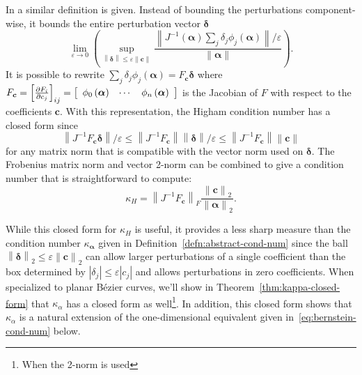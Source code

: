 \documentclass[3p, authoryear, square]{elsarticle}
\theoremstyle{definition}
\newcommand{\eps}{\varepsilon}
\begin{document}
In \cite[Chapter~25, Section 25.4]{Higham2002} a similar definition is
given. Instead of bounding the perturbations component-wise, it bounds
the entire perturbation vector \(\bm{\delta}\)
\begin{equation}
  \lim_{\eps \to 0} \left(\sup_{\left \lVert \bm{\delta} \right \rVert \leq
  \eps \left \lVert \bm{c} \right \rVert} \frac{\left \lVert
  J^{-1}\left(\bm{\alpha}\right) \sum_j \delta_j
  \phi_j\left(\bm{\alpha}\right) \right \rVert / \eps}{
  \left \lVert \bm{\alpha} \right \rVert}\right).
\end{equation}
It is possible to rewrite \(\sum_j \delta_j \phi_j\left(\bm{\alpha}\right) =
F_{\bm{c}} \bm{\delta}\) where \(F_{\bm{c}} =
\left[\frac{\partial F_i}{\partial c_j}\right]_{ij} =
\left[\begin{array}{c c c} \phi_0\left(\bm{\alpha}\right) & \cdots &
\phi_n\left(\bm{\alpha}\right) \end{array}\right]\) is the Jacobian of \(F\)
with respect to the coefficients \(\bm{c}\). With this representation, the
Higham condition number has a closed form since
\begin{equation}
  \left \lVert
  J^{-1} F_{\bm{c}} \bm{\delta} \right \rVert / \eps \leq
  \left \lVert J^{-1} F_{\bm{c}} \right \rVert \left \lVert \bm{\delta} \right
  \rVert / \eps \leq \left \lVert J^{-1} F_{\bm{c}} \right \rVert \left \lVert
  \bm{c} \right \rVert
\end{equation}
for any matrix norm that is compatible with the vector norm used on
\(\bm{\delta}\). The Frobenius matrix norm and vector 2-norm can be
combined to give a condition number that is straightforward to compute:
\begin{equation}\label{eq:higham-cond-num}
  \kappa_H = \left \lVert J^{-1} F_{\bm{c}} \right \rVert_F
  \frac{\left \lVert \bm{c}
  \right \rVert_2}{\left \lVert \bm{\alpha} \right \rVert_2}.
\end{equation}

While this closed form for \(\kappa_H\) is useful, it provides a less sharp
measure than the condition number \(\kappa_{\bm{\alpha}}\) given in
Definition~\ref{defn:abstract-cond-num} since the ball \(\left \lVert
\bm{\delta} \right \rVert_2 \leq \eps \left \lVert \bm{c} \right \rVert_2\)
can allow larger perturbations of a single coefficient than the box determined
by \(\left|\delta_j\right| \leq \eps \left|c_j\right|\) and allows
perturbations in zero coefficients.
When specialized to planar B\'{e}zier curves, we'll show in
Theorem~\ref{thm:kappa-closed-form} that \(\kappa_{\alpha}\) has a closed form
as well\footnote{When the 2-norm is used}. In addition, this closed
form shows that \(\kappa_{\alpha}\) is a natural extension of the
one-dimensional equivalent given in~\eqref{eq:bernstein-cond-num} below.
\end{document}
